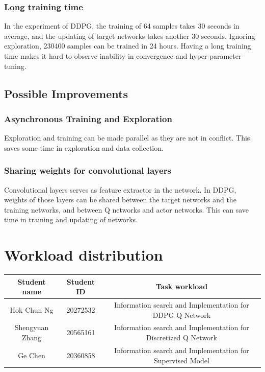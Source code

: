 \documentclass[a4paper]{article}
\begin{document}
\subsubsection{Long training time}

In the experiment of DDPG, the training of 64 samples takes 30 seconds in average, and the updating of target networks takes another 30 seconds. Ignoring exploration, 230400 samples can be trained in 24 hours. Having a long training time makes it hard to observe inability in convergence and hyper-parameter tuning.

\subsection{Possible Improvements}

\subsubsection{Asynchronous Training and Exploration}

Exploration and training can be made parallel as they are not in conflict. This saves some time in exploration and data collection.

\subsubsection{Sharing weights for convolutional layers}

Convolutional layers serves as feature extractor in the network. In DDPG, weights of those layers can be shared between the target networks and the training networks, and between Q networks and actor networks. This can save time in training and updating of networks.


\section{Workload distribution}
\begin{table}[htbp]
\centering
\begin{tabular}{|c|c|c|}
\hline
Student name & Student ID & Task workload   \\ \hline
Hok Chun Ng & 20272532 & Information search and Implementation for DDPG Q Network \\
Shengyuan Zhang & 20565161 & Information search and Implementation for Discretized Q Network   \\
Ge Chen & 20360858 & Information search and Implementation for Supervised Model \\ \hline
\end{tabular}
\label{table:task_allocation}
\end{table}
\end{document}
